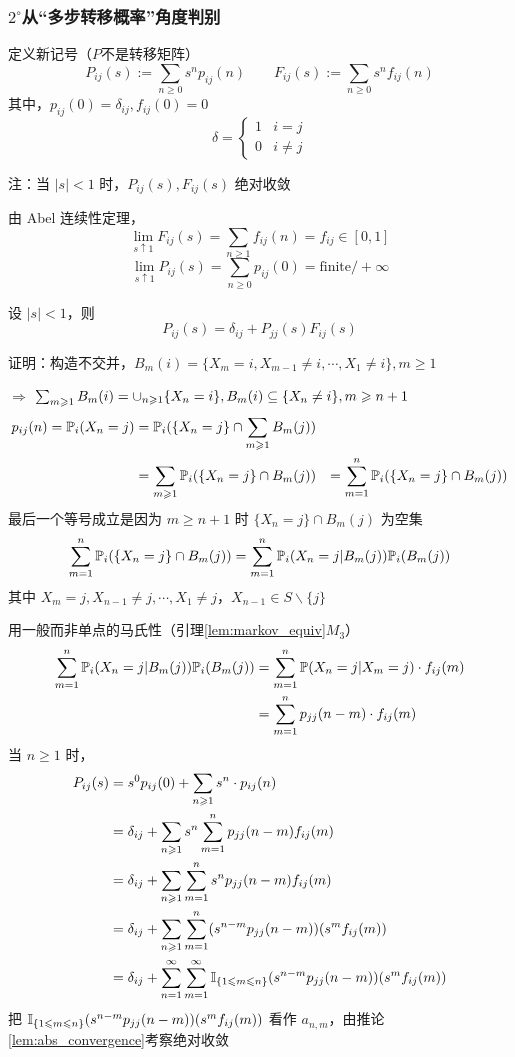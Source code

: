 \subsubsection*{$2^{\circ}$从“多步转移概率”角度判别}

定义新记号（$P$不是转移矩阵）
\[
P_{ij}(s):=\sum_{n\geq 0}s^n p_{ij}(n)\qquad F_{ij}(s):=\sum_{n\geq 0}s^n f_{ij}(n)
\]
其中，$p_{ij}(0)=\delta_{ij},f_{ij}(0)=0$
\[
\delta=\begin{cases}
    1 & i=j\\
    0 & i\neq j
\end{cases}
\]

注：当 $|s|<1$ 时，$P_{ij}(s),F_{ij}(s)$ 绝对收敛

由 Abel 连续性定理，
\[
\lim_{s\uparrow 1}F_{ij}(s)=\sum_{n\geq 1}f_{ij}(n)=f_{ij}\in [0,1]
\]
\[
\lim_{s\uparrow 1}P_{ij}(s)=\sum_{n\geq 0}p_{ij}(0)=\text{finite}/+\infty
\]
\begin{lemma}
     设 $|s|<1$，则
    \[
    P_{ij}(s)=\delta_{ij}+P_{jj}(s)F_{ij}(s)
    \]
\end{lemma}

证明：构造不交并，$B_m(i)=\{X_m=i,X_{m-1}\neq i,\cdots,X_1\neq i\}, m\geq 1$

$\Rightarrow$ $\sum_{m\geqslant 1}B_m(i)=\cup_{n\geqslant 1}\{X_n=i\}, B_m(i)\subseteq \{X_n\neq i\}, m\geqslant n+1$
\[
\begin{aligned}
    p_{ij}(n)=\mathbb{P}_i(X_n=j)&=\mathbb{P}_i(\{X_n=j\}\cap \sum_{m\geqslant 1}B_m(j))\\
    &=\sum_{m\geqslant 1}\mathbb{P}_i(\{X_n=j\}\cap B_m(j))
    &=\sum_{m=1}^n\mathbb{P}_i(\{X_n=j\}\cap B_m(j))
\end{aligned}
\]
最后一个等号成立是因为 $m\geq n+1$ 时 $\{X_n=j\}\cap B_m(j)$ 为空集
\[
\sum_{m=1}^n\mathbb{P}_i(\{X_n=j\}\cap B_m(j))=\sum_{m=1}^n\mathbb{P}_i(X_n=j|B_m(j))\mathbb{P}_i(B_m(j))
\]
其中 $X_m=j,X_{n-1}\neq j,\cdots,X_1\neq j$，$X_{n-1}\in S\backslash \{j\}$

用一般而非单点的马氏性（引理\ref{lem:markov_equiv}$M_3$）
\[
\begin{aligned}
    \sum_{m=1}^n\mathbb{P}_i(X_n=j|B_m(j))\mathbb{P}_i(B_m(j))&=\sum_{m=1}^n\mathbb{P}(X_n=j|X_m=j)\cdot f_{ij}(m)\\
    &=\sum_{m=1}^n p_{jj}(n-m)\cdot f_{ij}(m)
\end{aligned}
\]
当 $n\geq 1$ 时，
\[
\begin{aligned}
    P_{ij}(s)&=s^0p_{ij}(0)+\sum_{n\geqslant 1}s^n\cdot p_{ij}(n)\\
    &=\delta_{ij}+\sum_{n\geqslant 1}s^n\sum_{m=1}^n p_{jj}(n-m)f_{ij}(m)\\
    &=\delta_{ij}+\sum_{n\geqslant 1}\sum_{m=1}^n s^n p_{jj}(n-m)f_{ij}(m)\\
    &=\delta_{ij}+\sum_{n\geqslant 1}\sum_{m=1}^n(s^{n-m}p_{jj}(n-m))(s^m f_{ij}(m))\\
    &=\delta_{ij}+\sum_{n=1}^{\infty}\sum_{m=1}^{\infty}\mathbb I_{\{1\leqslant m\leqslant n\}}(s^{n-m}p_{jj}(n-m))(s^m f_{ij}(m))
\end{aligned}
\]
把 $\mathbb I_{\{1\leqslant m\leqslant n\}}(s^{n-m}p_{jj}(n-m))(s^m f_{ij}(m))$ 看作 $a_{n,m}$，由推论\ref{lem:abs_convergence}考察绝对收敛

